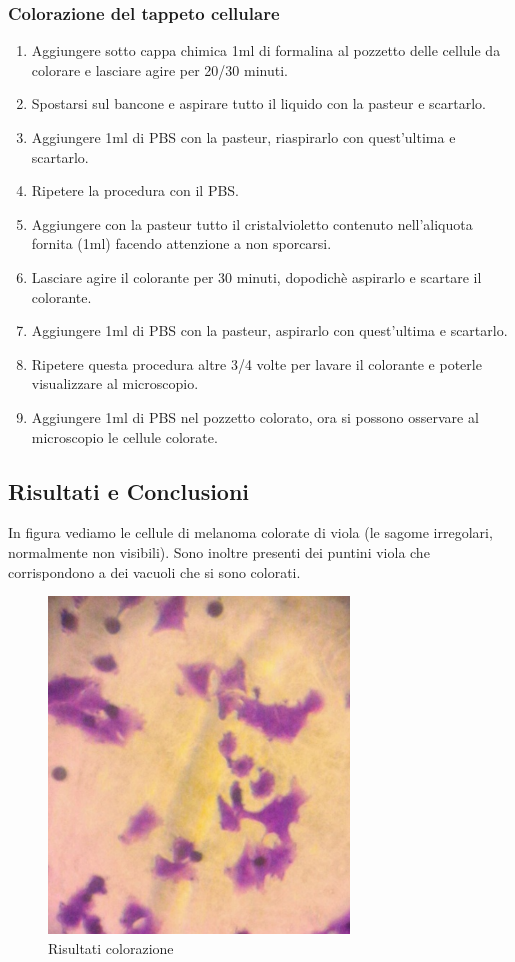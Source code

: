\subsubsection{Colorazione del tappeto cellulare}

\begin{enumerate}
    \item Aggiungere sotto cappa chimica 1ml di formalina al pozzetto delle cellule da 
    colorare e lasciare agire per 20/30 minuti.
    \item Spostarsi sul bancone e aspirare tutto il liquido con la pasteur e scartarlo.
    \item Aggiungere 1ml di PBS con la pasteur, riaspirarlo con quest'ultima e scartarlo.
    \item Ripetere la procedura con il PBS.
    \item Aggiungere con la pasteur tutto il cristalvioletto contenuto nell'aliquota fornita
    (1ml) facendo attenzione a non sporcarsi.
    \item Lasciare agire il colorante per 30 minuti, dopodich\`e aspirarlo e scartare il colorante.
    \item Aggiungere 1ml di PBS con la pasteur, aspirarlo con quest'ultima e scartarlo.
    \item Ripetere questa procedura altre 3/4 volte per lavare il colorante e poterle visualizzare
    al microscopio.
    \item Aggiungere 1ml di PBS nel pozzetto colorato, ora si possono osservare al 
    microscopio le cellule colorate.
\end{enumerate}

\subsection{Risultati e Conclusioni}

In figura vediamo le cellule di melanoma colorate di viola (le sagome irregolari, normalmente non visibili).
Sono inoltre presenti dei puntini viola che corrispondono a dei vacuoli che si sono colorati.

\begin{figure}[htbp]
	\centering
	\includegraphics[width=80mm]{./immagini/melanoma.png}
	\caption{Risultati colorazione}
	\label{melanoma}
\end{figure}


